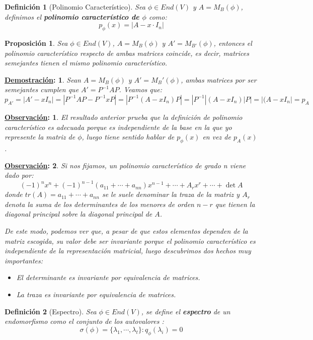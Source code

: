 \documentclass[10pt,a4paper,openright]{book}
\theoremstyle{break}
\newtheorem*{defi}{Definición}
\newtheorem*{prop}{Proposición}
\newtheorem*{demo}{\underline{Demostración}:}
\newtheorem*{obs}{\underline{Observación}:}
\begin{document}
\begin{defi}[Polinomio Característico]
Sea $\phi\in End(V)$ y $A = M_B(\phi)$, definimos el \textbf{polinomio característico de $\phi$} como:
$$p_\phi(x) = |A- x\cdot I_n|$$
\end{defi}

\begin{prop}
Sea $\phi\in End(V)$, $A=M_B(\phi)$ y $A'=M_{B'}(\phi)$, entonces el polinomio característico respecto de ambas matrices coincide, es decir, matrices semejantes tienen el mismo polinomio característico.
\end{prop}
\begin{demo}
Sean $A=M_B(\phi)$ y $A'=M_B'(\phi)$, ambas matrices por ser semejantes cumplen que $A'=P^{-1}AP$. Veamos que:
$$p_{A'}=|A'-xI_n|=|P^{-1}AP-P^{-1}xP|=|P^{-1}(A-xI_n)P|=|P^{-1}|(A-xI_n)|P|=|(A-xI_n|=p_A$$
\end{demo}

\begin{obs}
El resultado anterior prueba que la definición de polinomio característico es adecuada porque es independiente de la base en la que yo represente la matriz de $\phi$, luego tiene sentido hablar de $p_\phi(x)$ en vez de $p_A(x)$.
\end{obs}

\begin{obs}
Si nos fijamos, un polinomio característico de grado n viene dado por:
$$(-1)^nx^n + (-1)^{n-1}(a_{11} + \cdots + a_{nn})x^{n-1} + \cdots + A_r x^r + \cdots + \det
A$$
donde $tr(A) = a_{11} + \cdots + a_{nn}$ se le suele denominar la traza de la matriz y $A_r$ denota la suma de los determinantes de los menores de orden $n-r$ que tienen la diagonal principal sobre la diagonal principal de $A$.

De este modo, podemos ver que, a pesar de que estos elementos dependen de la matriz escogida, su valor debe ser invariante porque el polinomio característico es independiente de la representación matricial, luego descubrimos dos hechos muy importantes:
\begin{itemize}
\item El determinante es invariante por equivalencia de matrices.
\item La traza es invariante por equivalencia de matrices.
\end{itemize}
\end{obs}

\begin{defi}[Espectro]
Sea $\phi \in End(V)$, se define el \textbf{espectro} de un endomorfismo como el conjunto de los autovalores :
$$\sigma(\phi)=\{\lambda_1, \cdots, \lambda_t\}: q_\phi(\lambda_i) = 0$$
\end{defi}
\end{document}
